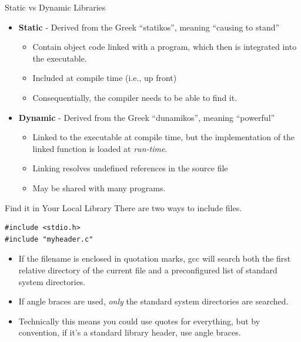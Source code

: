 \documentclass[11pt]{beamer}
\begin{document}
\begin{frame}{Static vs Dynamic Libraries}
\begin{itemize}
\item \textbf{Static} - Derived from the Greek ``statikos'', meaning ``causing to stand''
\begin{itemize}
\item Contain object code linked with a program, which then is integrated into the executable.
\item Included at compile time (i.e., up front)
\item Consequentially, the compiler needs to be able to find it.
\end{itemize}
\item \textbf{Dynamic} - Derived from the Greek ``dunamikos'', meaning ``powerful''
\begin{itemize}
\item Linked to the executable at compile time, but the implementation of the linked function is loaded at \emph{run-time}.  
\item Linking resolves undefined references in the source file
\item May be shared with many programs.  
\end{itemize}
\end{itemize}
\end{frame}

\begin{frame}[fragile=singleslide]{Find it in Your Local Library}
There are two ways to include files.
\begin{lstlisting}[style = C]
#include <stdio.h>
#include "myheader.c"
\end{lstlisting}
\begin{itemize}
\item If the filename is enclosed in quotation marks, gcc will search both the first relative directory of the current file and a preconfigured list of standard system directories.
\item If angle braces are used, \emph{only} the standard system directories are searched.  
\item Technically this means you could use quotes for everything, but by convention, if it's a standard library header, use angle braces.  
\end{itemize}
\end{frame}
\end{document}
